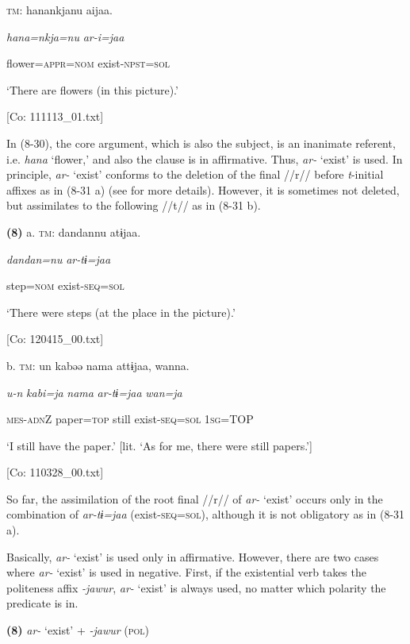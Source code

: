   \textsc{tm}:  hanankjanu  aijaa.

    \textit{hana=nkja=nu}  \textit{ar{}-i=jaa}

    flower=\textsc{appr}=\textsc{nom}  exist-\textsc{npst}=\textsc{sol}

    ‘There are flowers (in this picture).’

    [Co: 111113\_01.txt]

In (8-30), the core argument, which is also the subject, is an inanimate referent, i.e. \textit{hana} ‘flower,’ and also the clause is in affirmative. Thus, \textit{ar-} ‘exist’ is used. In principle, \textit{ar-} ‘exist’ conforms to the deletion of the final //r// before \textit{t}{}-initial affixes as in (8-31 a) (see  for more details). However, it is sometimes not deleted, but assimilates to the following //t// as in (8-31 b).

\textbf{(8)}  a.  \textsc{tm}:  dandannu  atɨjaa.

      \textit{dandan=nu}  \textit{ar-tɨ=jaa}

      step=\textsc{nom}  exist-\textsc{seq}=\textsc{sol}

      ‘There were steps (at the place in the picture).’

      [Co: 120415\_00.txt]

  b.  \textsc{tm}:  un  kabəə  nama  attɨjaa,  wanna.

      \textit{u-n}  \textit{kabi=ja}  \textit{nama}  \textit{ar-tɨ=jaa}  \textit{wan=ja}

      \textsc{mes}-\textsc{adn}Z  paper=\textsc{top}  still  exist-\textsc{seq}=\textsc{sol}  1\textsc{sg}=TOP

      ‘I still have the paper.’ [lit. ‘As for me, there were still papers.’]

      [Co: 110328\_00.txt]

So far, the assimilation of the root final //r// of \textit{ar-} ‘exist’ occurs only in the combination of \textit{ar-tɨ=jaa} (exist-\textsc{seq}=\textsc{sol}), although it is not obligatory as in (8-31 a).

  Basically, \textit{ar-} ‘exist’ is used only in affirmative. However, there are two cases where \textit{ar-} ‘exist’ is used in negative. First, if the existential verb takes the politeness affix \textit{{}-jawur}, \textit{ar-} ‘exist’ is always used, no matter which polarity the predicate is in.

\textbf{(8)}  \textit{ar-} ‘exist’ + \textit{{}-jawur} (\textsc{pol})

